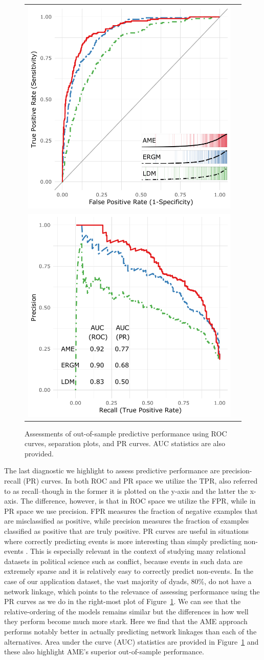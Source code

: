\documentclass[12pt,twocolumn,twoside]{pnas-new}
\begin{document}
\begin{figure}[ht]
	\centering
	\caption{Assessments of out-of-sample predictive performance using ROC curves, separation plots, and PR curves. AUC statistics are also provided.}
	\begin{tabular}{cc}
	\includegraphics[width=.4\textwidth]{roc_outSampleSmall} \\
	\includegraphics[width=.4\textwidth]{rocPr_outSampleSmall}
	\end{tabular}
	\label{fig:roc}
\end{figure}

The last diagnostic we highlight to assess predictive performance are precision-recall (PR) curves. In both ROC and PR space we utilize the TPR, also referred to as recall--though in the former it is plotted on the y-axis and the latter the x-axis. The difference, however, is that in ROC space we utilize the FPR, while in PR space we use precision. FPR measures the fraction of negative examples that are misclassified as positive, while precision measures the fraction of examples classified as positive that are truly positive. PR curves are useful in situations where correctly predicting events is more interesting than simply predicting non-events \citep{davis:goadrich:2006}. This is especially relevant in the context of studying many relational datasets in political science such as conflict, because events in such data are extremely sparse and it is relatively easy to correctly predict non-events. In the case of our application dataset, the vast majority of dyads, 80\%, do not have a network linkage, which points to the relevance of assessing performance using the PR curves as we do in the right-most plot of Figure~\ref{fig:roc}. We can see that the relative-ordering of the models remains similar but the differences in how well they perform become much more stark. Here we find that the AME approach performs notably better in actually predicting network linkages than each of the alternatives. Area under the curve (AUC) statistics are provided in Figure~\ref{fig:roc} and these also highlight AME's superior out-of-sample performance.
\end{document}
